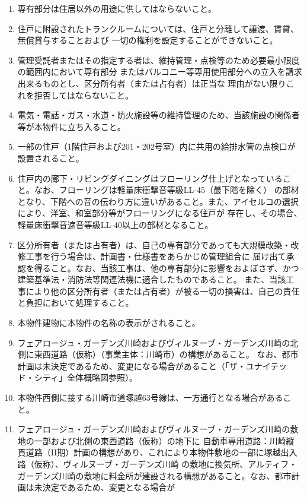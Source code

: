 \documentclass[
  luatex,
  paper=a4paper,
  fontsize=11pt,
  jafontsize=11pt,
  jlreq_notes,
]{jlreq}
\begin{document}
  \begin{enumerate}
  \item 専有部分は住居以外の用途に供してはならないこと。
  \item 住戸に附設されたトランクルームについては、住戸と分離して譲渡、賃貸、無償貸与することおよび
        一切の権利を設定することができないこと。
  \item 管理受託者またはその指定する者は、維持管理・点検等のため必要最小限度の範囲内において専有部分
        またはバルコニー等専用使用部分への立入を請求出来るものとし、区分所有者（または占有者）は正当な
        理由がない限りこれを拒否してはならないこと。
  \item 電気・電話・ガス・水道・防火施設等の維持管理のため、当該施設の関係者等が本物件に立ち入ること。
  \item 一部の住戸（1階住戸および201・202号室）内に共用の給排水管の点検口が設置されること。
  \item 住戸内の廊下・リビングダイニングはフローリング仕上げとなっていること。なお、フローリングは軽量床衝撃音等級LL-45（最下階を除く）
        の部材となり、下階への音の伝わり方に違いがあること。また、アイセルコの選択により、洋室、和室部分等がフローリングになる住戸が
        存在し、その場合、軽量床衝撃音遮音等級LL-40以上の部材となること。
  \item 区分所有者（または占有者）は、自己の専有部分であっても大規模改築・改修工事を行う場合は、計画書・仕様書をあらかじめ管理組合に
        届け出て承認を得ること。なお、当該工事は、他の専有部分に影響をおよぼさず、かつ建築基準法・消防法等関連法機に適合したものであること。
        また、当該工事により他の区分所有者（または占有者）が被る一切の損害は、自己の責任と負担において処理すること。
  \item 本物件建物に本物件の名称の表示がされること。
  \item フェアロージュ・ガーデンズ川崎およびヴィルヌーブ・ガーデンズ川崎の北側に東西道路（仮称）（事業主体：川崎市）の構想があること。
        なお、都市計画は未決定であるため、変更になる場合があること（「ザ・ユナイテッド・シティ」全体概略図参照）。
  \item 本物件西側に接する川崎市道塚越63号線は、一方通行となる場合があること。
  \item フェアロージュ・ガーデンズ川崎およびヴィルヌーブ・ガーデンズ川崎の敷地の一部および北側の東西道路（仮称）の地下に
        自動車専用道路：川崎縦貫道路（II期）計画の構想があり、これにより本物件敷地の一部に塚越出入路（仮称）、ヴィルヌーブ・ガーデンズ川崎
        の敷地に換気所、アルティフ・ガーデンズ川崎の敷地に料金所が建設される構想があること。なお、都市計画は未決定であるため、変更となる場合が

\end{enumerate}
\end{document}
